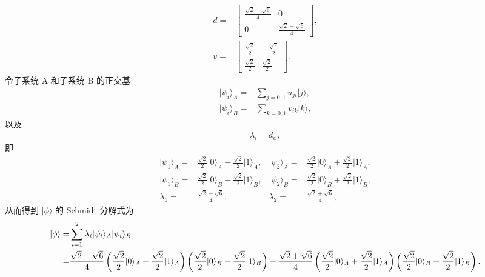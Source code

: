 \documentclass{assignment}
\begin{document}
\begin{sol}
\begin{itemize}
\begin{align}
            d=&\begin{bmatrix}
                \frac{\sqrt{2}-\sqrt{6}}{4}&0\\
                0&\frac{\sqrt{2}+\sqrt{6}}{4}
            \end{bmatrix},\\
            v=&\begin{bmatrix}
                \frac{\sqrt{2}}{2}&-\frac{\sqrt{2}}{2}\\
                \frac{\sqrt{2}}{2}&\frac{\sqrt{2}}{2}
            \end{bmatrix}.
        \end{align}
        令子系统 A 和子系统 B 的正交基
        \begin{align}
            \lvert\psi_i\rangle_A=&\sum_{j=0,1}u_{ji}\lvert j\rangle,\\
            \lvert\psi_i\rangle_B=&\sum_{k=0,1}v_{ik}\lvert k\rangle,
        \end{align}
        以及
        \begin{align}
            \lambda_i=d_{ii},
        \end{align}
        即
        \begin{align}
            \lvert\psi_1\rangle_A=&\frac{\sqrt{2}}{2}\lvert 0\rangle_A-\frac{\sqrt{2}}{2}\lvert 1\rangle_A,&\lvert\psi_2\rangle_A=&\frac{\sqrt{2}}{2}\lvert 0\rangle_A+\frac{\sqrt{2}}{2}\lvert 1\rangle_A,\\
            \lvert\psi_1\rangle_B=&\frac{\sqrt{2}}{2}\lvert 0\rangle_B-\frac{\sqrt{2}}{2}\lvert 1\rangle_B,&\lvert\psi_2\rangle_B=&\frac{\sqrt{2}}{2}\lvert 0\rangle_B+\frac{\sqrt{2}}{2}\lvert 1\rangle_B,\\
            \lambda_1=&\frac{\sqrt{2}-\sqrt{6}}{4},&\lambda_2=&\frac{\sqrt{2}+\sqrt{6}}{4},
        \end{align}
        从而得到 $\lvert\phi\rangle$ 的 Schmidt 分解式为
        {\small
        \begin{align}
            \notag\lvert\phi\rangle=&\sum_{i=1}^2\lambda_i\lvert\psi_i\rangle_A\lvert\psi_i\rangle_B\\
            =&\frac{\sqrt{2}-\sqrt{6}}{4}\left(\frac{\sqrt{2}}{2}\lvert 0\rangle_A-\frac{\sqrt{2}}{2}\lvert 1\rangle_A\right)\left(\frac{\sqrt{2}}{2}\lvert 0\rangle_B-\frac{\sqrt{2}}{2}\lvert 1\rangle_B\right)+\frac{\sqrt{2}+\sqrt{6}}{4}\left(\frac{\sqrt{2}}{2}\lvert 0\rangle_A+\frac{\sqrt{2}}{2}\lvert 1\rangle_A\right)\left(\frac{\sqrt{2}}{2}\lvert 0\rangle_B+\frac{\sqrt{2}}{2}\lvert 1\rangle_B\right).
        \end{align}
        }
    \end{itemize}
\end{sol}
\end{document}
